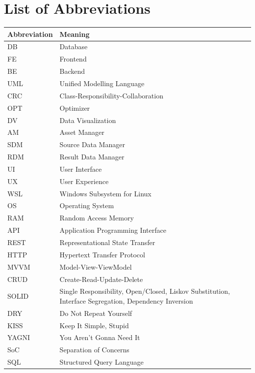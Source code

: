 \documentclass[11pt, a4paper, oneside]{report}
\begin{document}
\section*{List of Abbreviations}
\begin{table}[H]
\centering
\renewcommand{\arraystretch}{1.2} %
\begin{tabular}{l p{10cm}}
\toprule
\textbf{Abbreviation} & \textbf{Meaning} \\
\midrule
DB   & Database \\
FE   & Frontend \\
BE  & Backend \\
UML  & Unified Modelling Language \\
CRC & Class-Responsibility-Collaboration\\
OPT & Optimizer \\
DV & Data Visualization \\
AM & Asset Manager \\
SDM & Source Data Manager \\
RDM & Result Data Manager \\
UI & User Interface \\
UX & User Experience \\
WSL & Windows Subsystem for Linux \\
OS & Operating System \\
RAM & Random Access Memory \\
API & Application Programming Interface \\
REST & Representational State Transfer \\
HTTP & Hypertext Transfer Protocol \\
MVVM &  Model-View-ViewModel \\
CRUD & Create-Read-Update-Delete \\
SOLID & Single Responsibility, Open/Closed, Liskov Substitution, Interface Segregation, Dependency Inversion \\
DRY & Do Not Repeat Yourself \\
KISS & Keep It Simple, Stupid \\
YAGNI & You Aren’t Gonna Need It \\
SoC & Separation of Concerns \\
SQL & Structured Query Language \\
\bottomrule
\end{tabular}
\end{table}
\end{document}
